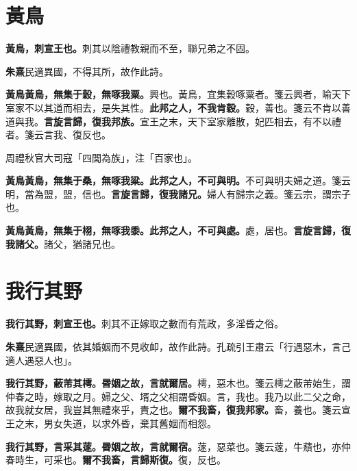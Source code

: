 \section{黃鳥}


\textbf{黃鳥，刺宣王也。}{\footnotesize 刺其以陰禮教親而不至，聯兄弟之不固。}

\begin{quoting}\textbf{朱熹}民適異國，不得其所，故作此詩。\end{quoting}

\textbf{黃鳥黃鳥，無集于榖，無啄我粟。}{\footnotesize 興也。黃鳥，宜集榖啄粟者。箋云興者，喻天下室家不以其道而相去，是失其性。}\textbf{此邦之人，不我肯穀。}{\footnotesize 穀，善也。箋云不肯以善道與我。}\textbf{言旋言歸，復我邦族。}{\footnotesize 宣王之末，天下室家離散，妃匹相去，有不以禮者。箋云言我、復反也。}

\begin{quoting}周禮秋官大司寇「四閭為族」，注「百家也」。\end{quoting}

\textbf{黃鳥黃鳥，無集于桑，無啄我粱。此邦之人，不可與明。}{\footnotesize 不可與明夫婦之道。箋云明，當為盟，盟，信也。}\textbf{言旋言歸，復我諸兄。}{\footnotesize 婦人有歸宗之義。箋云宗，謂宗子也。}

\textbf{黃鳥黃鳥，無集于栩，無啄我黍。此邦之人，不可與處。}{\footnotesize 處，居也。}\textbf{言旋言歸，復我諸父。}{\footnotesize 諸父，猶諸兄也。}

\section{我行其野}


\textbf{我行其野，刺宣王也。}{\footnotesize 刺其不正嫁取之數而有荒政，多淫昏之俗。}

\begin{quoting}\textbf{朱熹}民適異國，依其婚姻而不見收卹，故作此詩。孔疏引王肅云「行遇惡木，言己適人遇惡人也」。\end{quoting}

\textbf{我行其野，蔽芾其樗。昬姻之故，言就爾居。}{\footnotesize 樗，惡木也。箋云樗之蔽芾始生，謂仲春之時，嫁取之月。婦之父、壻之父相謂昏姻。言，我也。我乃以此二父之命，故我就女居，我豈其無禮來乎，責之也。}\textbf{爾不我畜，復我邦家。}{\footnotesize 畜，養也。箋云宣王之末，男女失道，以求外昏，棄其舊姻而相怨。}

\textbf{我行其野，言采其蓫。昬姻之故，言就爾宿。}{\footnotesize 蓫，惡菜也。箋云蓫，牛蘈也，亦仲春時生，可采也。}\textbf{爾不我畜，言歸斯復。}{\footnotesize 復，反也。}

